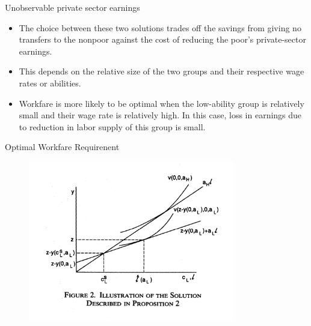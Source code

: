 \documentclass{beamer}
\begin{document}
\begin{frame}[allowframebreaks]{Unobservable private sector earnings }
\begin{itemize}
PROPOSITION 2: If both income-generating abilities and incomes are unobservable, one of the following two PAP's is cost minimizing: 
\begin{enumerate}
    \item (welfare) impose no work requirements and offer both ability groups a transfer
 of $z - y(0, a_L)$
 \item  (ii) (workfare) offer self-categorized high-ability individuals no benefits and offer self-categorized low-ability individuals a transfer of $z - y(0, a_L)$ and require them to work $c^s_L$. 
\end{enumerate}
\item The choice between these two solutions trades off the savings from giving no
transfers to the nonpoor against the cost of
reducing the poor's private-sector earnings.
\item This depends on the relative size of the two groups and their respective wage rates or abilities.
\item Workfare is more likely to be optimal when the low-ability group is relatively small and their wage rate is relatively high. In this case, loss in earnings due to reduction in labor supply of this group is small. 
\end{itemize}


\end{frame}
\begin{frame}{Optimal Workfare Requirenent}
\begin{figure}
\includegraphics[width=0.8\textwidth]{F2.png}
\end{figure}

\end{frame}
\end{document}
